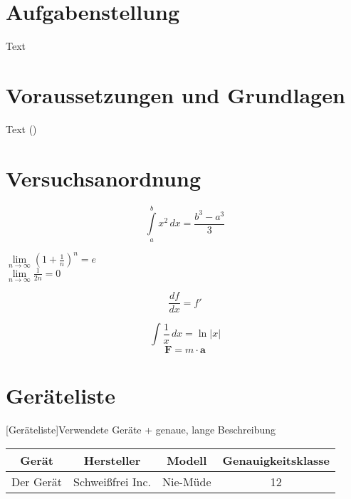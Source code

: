 \documentclass[11pt]{scrartcl}
\begin{document}
%

\tableofcontents
\newpage

\section{Aufgabenstellung}
\label{sec:aufgabenstellung}

Text


\section{Voraussetzungen und Grundlagen}
\label{sec:voraussetzungen-rundlagen}

Text (\cite[S. 1000]{ref:dem1})


\section{Versuchsanordnung}
\label{sec:versuchsanordnung}

\begin{equation}
\label{eq:grenzen-oben-unten}
    \int \limits_{a}^{b} x^2 \, dx =\frac{b^3-a^3}{3}  %
\end{equation}

\( \lim \limits_{n \to \infty} \left( 1 + \frac{1}{n} \right) ^{n} = e\)  \\ %
$\lim \limits_{n \to \infty} \frac{1}{2n} = 0$  %

\begin{displaymath}
    \frac{df}{dx} = f'
\end{displaymath}

\[ \int \frac{1}{x} \, dx = \ln|x| \]  %
$$ \textbf{F} = m \cdot \textbf{a} $$  %



\section{Geräteliste}
\label{sec:geraeteliste}

\begin{center}
[Geräteliste]{Verwendete Geräte + genaue, lange Beschreibung}  %
\label{tab:geraeteliste}
    \begin{tabular}{|c|c|c|c|} \hline
        Gerät & Hersteller & Modell & Genauigkeitsklasse \\ \hline
        Der Gerät & Schweißfrei Inc. & Nie-Müde & 12 \\ \hline
    \end{tabular}
\end{center}
\end{document}
